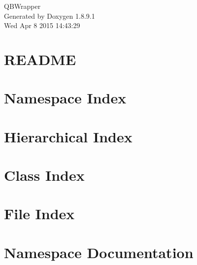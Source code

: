 \documentclass[twoside]{book}
\newcommand{\+}{\discretionary{\mbox{\scriptsize$\hookleftarrow$}}{}{}}
\newcommand{\clearemptydoublepage}{%
  \newpage{\pagestyle{empty}\cleardoublepage}%
}
\begin{document}
\hypersetup{pageanchor=false,
             bookmarks=true,
             bookmarksnumbered=true,
             pdfencoding=unicode
            }
\begin{titlepage}
\vspace*{7cm}
\begin{center}%
{\Large Q\+B\+Wrapper }\\
\vspace*{1cm}
{\large Generated by Doxygen 1.8.9.1}\\
\vspace*{0.5cm}
{\small Wed Apr 8 2015 14:43:29}\\
\end{center}
\end{titlepage}
\clearemptydoublepage
\tableofcontents
\clearemptydoublepage
{}
\hypersetup{pageanchor=true}

\chapter{R\+E\+A\+D\+M\+E}
\label{md__c_1_cygwin_home__engineer__development_time-clock-front__q_b_wrapper__r_e_a_d_m_e}
\hypertarget{md__c_1_cygwin_home__engineer__development_time-clock-front__q_b_wrapper__r_e_a_d_m_e}{}

\chapter{Namespace Index}

\chapter{Hierarchical Index}

\chapter{Class Index}

\chapter{File Index}

\chapter{Namespace Documentation}



\end{document}
